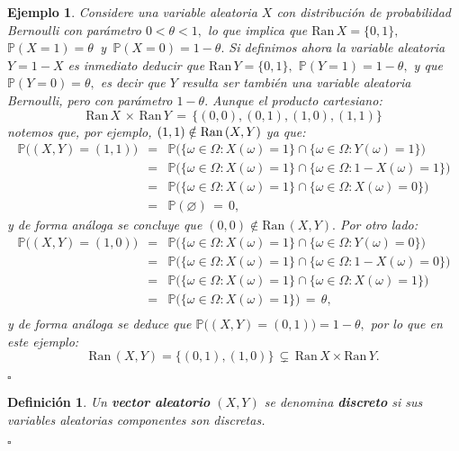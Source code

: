 \documentclass[spanish,10pt,letterpaper]{article}
\newtheorem{defi}{Definición}
\newtheorem{ejem}{Ejemplo}
\newcommand{\prob}{\mathbb{P}}
\newcommand{\qed}{\begin{flushright}$\square$\end{flushright}}
\begin{document}
\begin{ejem}\label{ej:BernoulliBiv1}
    Considere una variable aleatoria $X$ con distribución de probabilidad Bernoulli con parámetro $0<\theta<1,$ lo que implica que $\text{Ran}\,X=\{0,1\},$ $\prob(X=1)=\theta\,$ y $\,\prob(X=0)=1-\theta.$ Si definimos ahora la variable aleatoria $Y=1-X$ es inmediato deducir que $\text{Ran}\,Y=\{0,1\},$ $\prob(Y=1)=1-\theta,$ y que $\prob(Y=0)=\theta,$ es decir que $Y$ resulta ser también una variable aleatoria Bernoulli, pero con parámetro $1-\theta.$ Aunque el producto cartesiano: $$\text{Ran}\,X\,\times\,\text{Ran}\,Y \,=\, \{(0,0), (0,1), (1,0), (1,1)\}$$
    notemos que, por ejemplo, $(1,1)\notin\text{Ran\,}(X,Y)$ ya que:
    \begin{eqnarray*}
        \prob\big((X,Y)=(1,1)\big) &=& \prob\big(\{\omega\in\Omega:X(\omega)=1\}\cap\{\omega\in\Omega:Y(\omega)=1\}\big) \\
        &=& \prob\big(\{\omega\in\Omega:X(\omega)=1\}\cap\{\omega\in\Omega:1-X(\omega)=1\}\big) \\
        &=& \prob\big(\{\omega\in\Omega:X(\omega)=1\}\cap\{\omega\in\Omega:X(\omega)=0\}\big) \\
        &=& \prob(\varnothing) \,=\, 0,
    \end{eqnarray*}
    y de forma análoga se concluye que $(0,0)\notin\text{Ran}\,(X,Y).$ Por otro lado:
    \begin{eqnarray*}
        \prob\big((X,Y)=(1,0)\big) &=& \prob\big(\{\omega\in\Omega:X(\omega)=1\}\cap\{\omega\in\Omega:Y(\omega)=0\}\big) \\
        &=& \prob\big(\{\omega\in\Omega:X(\omega)=1\}\cap\{\omega\in\Omega:1-X(\omega)=0\}\big) \\
        &=& \prob\big(\{\omega\in\Omega:X(\omega)=1\}\cap\{\omega\in\Omega:X(\omega)=1\}\big) \\
        &=& \prob\big(\{\omega\in\Omega:X(\omega)=1\}\big) \,=\, \theta,\\
    \end{eqnarray*}
    y de forma análoga se deduce que $\prob\big((X,Y)=(0,1)\big)=1-\theta,$ por lo que en este ejemplo:
    $$\text{Ran}\,(X,Y)=\{(0,1),(1,0)\} \,\subsetneq\,\text{Ran}\,X\times\text{Ran}\,Y.$$ \qed 
\end{ejem}

\begin{defi}\label{def:vecdiscreto}
    Un \textbf{vector aleatorio} $(X,Y)$ se denomina \textbf{discreto} si sus variables aleatorias componentes son discretas. \qed 
\end{defi}
\end{document}
